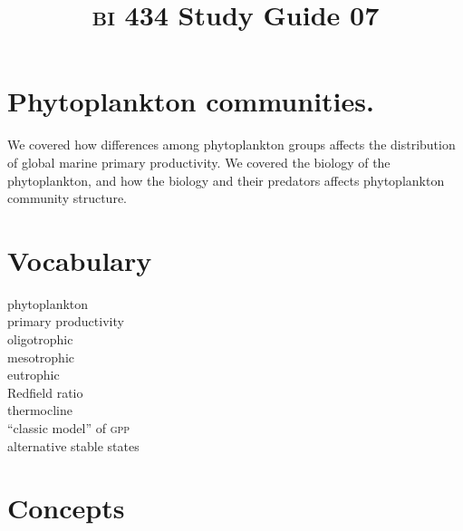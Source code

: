 \documentclass[letterpaper]{tufte-handout}
\title{{\scshape bi} 434 Study Guide 07}
\date{} %
\begin{document}
\maketitle	%

\section*{Phytoplankton communities.}

We covered how differences among phytoplankton groups affects the distribution of global marine primary productivity. We covered the biology of the phytoplankton, and how the biology and their predators affects phytoplankton community structure.

\section*{Vocabulary}

\vspace{-1\baselineskip}
\begin{multicols}{2}
phytoplankton \\
primary productivity \\
oligotrophic \\
mesotrophic \\
eutrophic \\
Redfield ratio \\
thermocline \\
``classic model'' of \textsc{gpp}\\
alternative stable states\\
\end{multicols}

\section*{Concepts}
\end{document}
